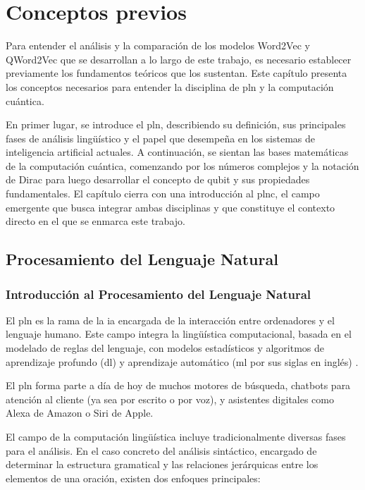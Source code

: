 \chapter{Conceptos previos}
\label{chap:conceptos_previos}

Para entender el análisis y la comparación de los modelos Word2Vec y QWord2Vec que se desarrollan a lo largo de este trabajo, es necesario establecer previamente los fundamentos teóricos que los sustentan. Este capítulo presenta los conceptos necesarios para entender la disciplina de \gls{pln} y la computación cuántica.

En primer lugar, se introduce el \gls{pln}, describiendo su definición, sus principales fases de análisis lingüístico y el papel que desempeña en los sistemas de inteligencia artificial actuales. A continuación, se sientan las bases matemáticas de la computación cuántica, comenzando por los números complejos y la notación de Dirac para luego desarrollar el concepto de qubit y sus propiedades fundamentales. El capítulo cierra con una introducción al \gls{plnc}, el campo emergente que busca integrar ambas disciplinas y que constituye el contexto directo en el que se enmarca este trabajo.

\section{Procesamiento del Lenguaje Natural}
\label{chap:pln}

\subsection{Introducción al Procesamiento del Lenguaje Natural}

El \acrfull{pln} es la rama de la \gls{ia} encargada de la interacción entre ordenadores y el lenguaje humano. Este campo integra la lingüística computacional, basada en el modelado de reglas del lenguaje, con modelos estadísticos y algoritmos de aprendizaje profundo (\gls{dl}) y aprendizaje automático (\gls{ml} por sus siglas en inglés) \cite{stryker_what_nlp}.

El \gls{pln} forma parte a día de hoy de muchos motores de búsqueda, chatbots para atención al cliente (ya sea por escrito o por voz), y asistentes digitales como Alexa de Amazon o Siri de Apple.

El campo de la computación lingüística incluye tradicionalmente diversas fases para el análisis. En el caso concreto del análisis sintáctico, encargado de determinar la estructura gramatical y las relaciones jerárquicas entre los elementos de una oración, existen dos enfoques principales:

